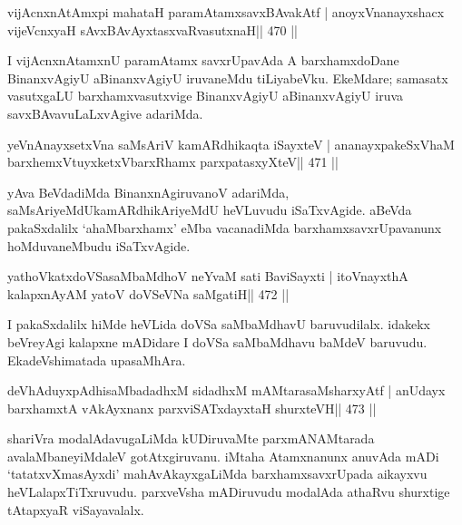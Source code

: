 
\begin{shl}
vijAcnxnAtAmx\s pi mahataH paramAtamxsavxBAvakAtf |
anoyxV\s nanayxshacx vijeVcnxyaH sAvxBAvAyxtasxvaRvasutxnaH\hfill || 470 ||
\end{shl}

\begin{artha}
I vijAcnxnAtamxnU paramAtamx savxrUpavAda A barxhamxdoDane BinanxvAgiyU aBinanxvAgiyU iruvaneMdu tiLiyabeVku. EkeMdare; samasatx vasutxgaLU barxhamxvasutxvige BinanxvAgiyU aBinanxvAgiyU iruva savxBAvavuLaLxvAgive adariMda.
\end{artha}




\begin{shl}
yeVnAnayxsetxVna saMsAriV kamARdhikaqta iSayxteV |
ananayxpakeSxV\s haM barxhemxVtuyxketxVbarxRhamx parxpatasxyXteV\hfill || 471 ||
\end{shl}

\begin{artha}
yAva BeVdadiMda BinanxnAgiruvanoV adariMda, saMsAriyeMdU\break kamARdhikAriyeMdU heVLuvudu iSaTxvAgide. aBeVda pakaSxdalilx `ahaMbarxhamx' eMba vacanadiMda barxhamxsavxrUpavanunx hoMduvaneMbudu iSaTxvAgide.
\end{artha}

\begin{shl}
yathoVkatxdoVSasaMbaMdhoV neYvaM sati BaviSayxti |
itoV\s nayxthA kalapxnAyAM yatoV doVSeVNa saMgatiH\hfill || 472 ||
\end{shl}

\begin{artha}
I pakaSxdalilx hiMde heVLida doVSa saMbaMdhavU baruvudilalx. idakekx beVreyAgi kalapxne mADidare I doVSa saMbaMdhavu baMdeV baruvudu. EkadeVshimatada upasaMhAra.
\end{artha}



\begin{shl}
deVhAduyxpAdhisaMbadadhxM sidadhxM mAMtarasaMsharxyAtf |
anUdayx barxhamxtA vAkAyxnanx parxviSATxdayxtaH shurxteVH\hfill || 473 ||
\end{shl}

\begin{artha}
shariVra modalAdavugaLiMda kUDiruvaMte parxmANAMtarada  avalaMbaneyiMdaleV gotAtxgiruvanu. iMtaha Atamxnanunx anuvAda mADi `tatatxvXmasAyxdi' mahAvAkayxgaLiMda barxhamxsavxrUpada aikayxvu heVLalapxTiTxruvudu. parxveVsha mADiruvudu modalAda athaRvu shurxtige tAtapxyaR viSayavalalx.
\end{artha}


